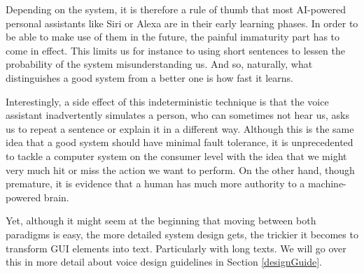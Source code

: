 Depending on the system, it is therefore a rule of thumb that most AI-powered personal assistants like Siri or Alexa are in their early learning phases. In order to be able to make use of them in the future, the painful immaturity part has to come in effect. This limits us for instance to using short sentences to lessen the probability of the system misunderstanding us. And so, naturally, what distinguishes a good system from a better one is how fast it learns.


Interestingly, a side effect of this indeterministic technique is that the voice assistant inadvertently simulates a person, who can sometimes not hear us, asks us to repeat a sentence or explain it in a different way. Although this is the same idea that a good system should have minimal fault tolerance, it is unprecedented to tackle a computer system on the consumer level with the idea that we might very much hit or miss the action we want to perform. On the other hand, though premature, it is evidence that a human has much more authority to a machine-powered brain.


Yet, although it might seem at the beginning that moving between both paradigms is easy, the more detailed system design gets, the trickier it becomes to transform GUI elements into text. Particularly with long texts. We will go over this in more detail about voice design guidelines in Section \ref{designGuide}.







